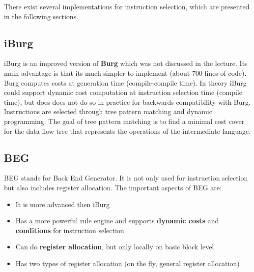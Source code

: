 \documentclass[a4paper,10pt]{article}
\begin{document}
There exist several implementations for instruction selection, which are presented in the following sections.
\subsection{iBurg}
iBurg is an improved version of \textbf{Burg} which was not discussed in the lecture. Its main advantage is that its much
       simpler to implement (about 700 lines of code). Burg computes costs at generation time (compile-compile time). In theory iBurg
       could support dynamic cost computation at instruction selection time (compile time), but does does not do so in practice for
       backwards compatibility with Burg. Instructions are selected through tree pattern matching and dynamic programming. The goal of
       tree pattern matching is to find a minimal cost cover for the data flow tree that represents the operations of the intermediate
       language.

\subsection{BEG}
BEG stands for Back End Generator. It is not only used for instruction selection but also includes register allocation. The important
aspects of BEG are:
\begin{itemize}
    \item It is more advanced then iBurg
    \item Has a more powerful rule engine and supports \textbf{dynamic costs} and \textbf{conditions} for instruction selection.
    \item Can do \textbf{register allocation}, but only locally on basic block level
    \item Has two types of register allocation (on the fly, general register allocation)
\end{itemize}
\end{document}

